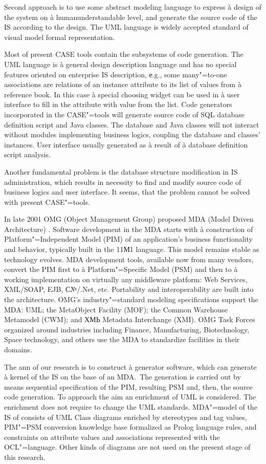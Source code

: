 \documentclass{intech}
\begin{document}
Second approach is to use some abstract modeling language to express à design of the system on à humanunderstandable level, and generate the source code of the IS according to the design. The UML language \cite{b2} is widely accepted standard of visual model formal
representation.

Most of present CASE tools contain the subsystems of code generation. The UML language is à general design description language and has no special features oriented on enterprise IS description, е.g., some many"=to-one associations are relations of an instance attribute to its list of values from à reference book. In this case à special choosing widget can be used in à user interface to fill in the attribute with value from the list. Code generators incorporated in the CASE"=tools will generate source code of SQL database definition script and Java classes. The database and Java classes will not interact without modules implementing business logics, coupling the database and classes' instances. User interface usually generated as à result of à database definition script analysis.

Another fundamental problem is the database structure modification in IS administration, which results in necessity to find and modify source code of business logics and user interface. It seems, that the problem cannot be solved with present CASE"=tools.

In late 2001 OMG (Object Management Group) proposed MDA (Model Driven Architecture) \cite{b3}. Software development in the MDA starts with à construction of Platform"=Independent Model (PIM) of an application's business functionality and behavior, typically built in the 11М1 language. This model remains stable as technology evolves. MDA development tools, available now from many vendors, convert the PIM first to à Platform"=Specific Model (PSM) and then to à working implementation on virtually any middleware platform: Web Services, XML/SOAP, EJB, С№/.Net, etc. Portability and interoperability are built into the architecture. OMG's industry"=standard modeling specifications support the MDA: UML; the MetaObject Facility (MOF); the Common Warehouse Metamodel (CWM); and ХМЬ Metadata Interchange (XMI). OMG Task Forces organized around industries including Finance, Manufacturing, Biotechnology, Space technology, and others use the MDA to standardize facilities in their domains.

The ann of our research is to construct à generator software, which can generate à kernel of the IS on the base of an MDA.~The generation is carried out by means sequential specification of the PIM, resulting PSM and, then, the source code generation. To approach the aim an enrichment of UML is considered. The enrichment does not require to change the UML standards. MDA"=model of the IS of consists of UML Class diagrams enriched by stereotypes and tag values, PIM"=PSM conversion knowledge base formalized as Prolog language rules, and constraints on attribute values and associations represented with the OCL"=language. Other kinds of diagrams are not used on the present stage of this research.
\end{document}

